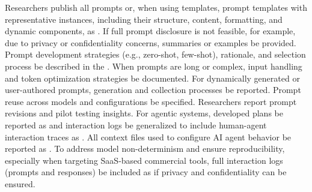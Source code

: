 Researchers \must publish all prompts or, when using templates, prompt templates with representative instances, including their structure, content, formatting, and dynamic components, as \supplementarymaterial. If full prompt disclosure is not feasible, for example, due to privacy or confidentiality concerns, summaries or examples \should be provided. Prompt development strategies (e.g., zero-shot, few-shot), rationale, and selection process \must be described in the \paper. When prompts are long or complex, input handling and token optimization strategies \must be documented. For dynamically generated or user-authored prompts, generation and collection processes \must be reported. Prompt reuse across models and configurations \must be specified. Researchers \should report prompt revisions and pilot testing insights. For agentic systems, developed plans \should be reported as \supplementarymaterial and interaction logs \should be generalized to include human-agent interaction traces as \supplementarymaterial. All context files used to configure AI agent behavior \should be reported as \supplementarymaterial. To address model non-determinism and ensure reproducibility, especially when targeting SaaS-based commercial tools, full interaction logs (prompts and responses) \should be included as \supplementarymaterial if privacy and confidentiality can be ensured.